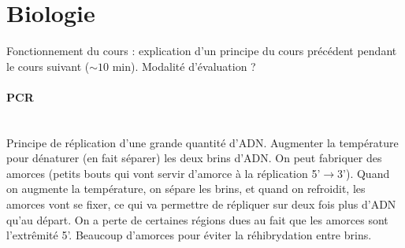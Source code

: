 \documentclass[10pt,a4paper]{article}
\begin{document}
\section*{Biologie}

Fonctionnement du cours : explication d'un principe du cours précédent pendant le cours suivant ($\sim 10$ min). Modalité d'évaluation ?
\paragraph{PCR}\ \\
Principe de réplication d'une grande quantité d'ADN. Augmenter la température pour dénaturer (en fait séparer) les deux brins d'ADN. On peut fabriquer des amorces (petits bouts qui vont servir d'amorce à la réplication 5'$\rightarrow$3'). Quand on augmente la température, on sépare les brins, et quand on refroidit, les amorces vont se fixer, ce qui va permettre de répliquer sur deux fois plus d'ADN qu'au départ. On a perte de certaines régions dues au fait que les amorces sont l'extrêmité 5'. Beaucoup d'amorces pour éviter la réhibrydation entre brins.
\end{document}
